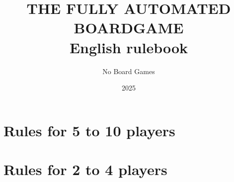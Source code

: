 \documentclass[a5paper, 10pt, openany]{book}
\title{\uppercase{The Fully Automated\\ Boardgame}\\
    English rulebook}
\subtitle{A party game about robots and strikes.\\
    Become a greedy boss or a riotous worker!
    
    ---
    
    From 2 to 10 players\\
    Duration 1 to 60 minutes}
\author{No Board Games}
\date{2025}
\begin{document}

\maketitle

\tableofcontents



\mainmatter



\chapter{Rules for 5 to 10 players}\label{ch:5-10}


    

    \stopthumb
    
    \clearpage

\chapter{Rules for 2 to 4 players}\label{ch:2-4}


    \graphicspath{ {./contents_img/} }

    

    \stopthumb

\appendix
    
\end{document}
